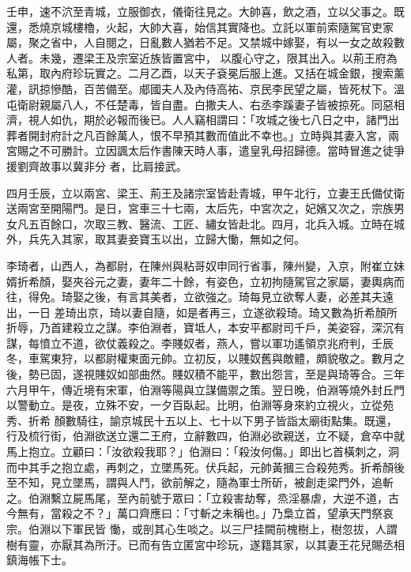 \begin{pinyinscope}
 壬申，速不泬至青城，立服御衣，儀衛往見之。大帥喜，飲之酒，立以父事之。既還，悉燒京城樓櫓，火起，大帥大喜，始信其實降也。立託以軍前索隨駕官吏家屬，聚之省中，人自閱之，日亂數人猶若不足。又禁城中嫁娶，有以一女之故殺數人者。未幾，遷梁王及宗室近族皆置宮中，
 以腹心守之，限其出入。以荊王府為私第，取內府珍玩實之。二月乙酉，以天子袞冕后服上進。又括在城金銀，搜索薰灌，訊掠慘酷，百苦備至。郕國夫人及內侍高祐、京民李民望之屬，皆死杖下。溫屯衛尉親屬八人，不任楚毒，皆自盡。白撒夫人、右丞李蹊妻子皆被掠死。同惡相濟，視人如仇，期於必報而後已。人人竊相謂曰：「攻城之後七八日之中，諸門出葬者開封府計之凡百餘萬人，恨不早預其數而值此不幸也。」立時與其妻入宮，兩宮賜之不可勝計。立因諷太后作書陳天時人事，遣皇乳母招歸德。當時冒進之徒爭援劉齊故事以冀非分
 者，比肩接武。



 四月壬辰，立以兩宮、梁王、荊王及諸宗室皆赴青城，甲午北行，立妻王氏備仗衛送兩宮至開陽門。是日，宮車三十七兩，太后先，中宮次之，妃嬪又次之，宗族男女凡五百餘口，次取三教、醫流、工匠、繡女皆赴北。四月，北兵入城。立時在城外，兵先入其家，取其妻妾寶玉以出，立歸大慟，無如之何。



 李琦者，山西人，為都尉，在陳州與粘哥奴申同行省事，陳州變，入京，附崔立妹婿折希顏，娶夾谷元之妻，妻年二十餘，有姿色，立初拘隨駕官之家屬，妻輿病而往，得免。琦娶之後，有言其美者，立欲強之。琦每見立欲奪人妻，必差其夫遠出，一日
 差琦出京，琦以妻自隨，如是者再三，立遂欲殺琦。琦又數為折希顏所折辱，乃首建殺立之謀。李伯淵者，寶坻人，本安平都尉司千戶，美姿容，深沉有謀，每憤立不道，欲仗義殺之。李賤奴者，燕人，嘗以軍功遙領京兆府判，壬辰冬，車駕東狩，以都尉權東面元帥。立初反，以賤奴舊與敵體，頗貌敬之。數月之後，勢已固，遂視賤奴如部曲然。賤奴積不能平，數出怨言，至是與琦等合。三年六月甲午，傳近境有宋軍，伯淵等陽與立謀備禦之策。翌日晚，伯淵等燒外封丘門以警動立。是夜，立殊不安，一夕百臥起。比明，伯淵等身來約立視火，立從苑秀、折希
 顏數騎往，諭京城民十五以上、七十以下男子皆詣太廟街點集。既還，行及梳行街，伯淵欲送立還二王府，立辭數四，伯淵必欲親送，立不疑，倉卒中就馬上抱立。立顧曰：「汝欲殺我耶？」伯淵曰：「殺汝何傷。」即出匕首橫刺之，洞而中其手之抱立處，再刺之，立墜馬死。伏兵起，元帥黃摑三合殺苑秀。折希顏後至不知，見立墜馬，謂與人鬥，欲前解之，隨為軍士所斫，被創走梁門外，追斬之。伯淵繫立屍馬尾，至內前號于眾曰：「立殺害劫奪，烝淫暴虐，大逆不道，古今無有，當殺之不？」萬口齊應曰：「寸斬之未稱也。」乃梟立首，望承天門祭哀宗。伯淵以下軍民皆
 慟，或剖其心生啖之。以三尸挂闕前槐樹上，樹忽拔，人謂樹有靈，亦厭其為所汙。已而有告立匿宮中珍玩，遂籍其家，以其妻王花兒賜丞相鎮海帳下士。




\end{pinyinscope}

